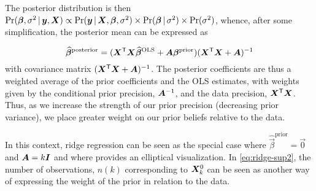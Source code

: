The posterior distribution is then
$\Pr (\bm{\beta}, \sigma^2 \, | \, \bm{y}, \bm{X}) \propto \Pr (\bm{y} \, | \, \bm{X}, \bm{\beta}, \sigma^2) \times
\Pr (\bm{\beta} \, | \, \sigma^2) \times \Pr (\sigma^2)$,
whence, after some simplification,
the posterior mean can be expressed as

\begin{equation}
\widehat{\bm{\beta}}^{\mathrm{posterior}} =
(\bm{X}^\mathsf{T} \bm{X}\widehat{\bm{\beta}}^{\mathrm{OLS}} + \bm{A} \bm{\beta}^{\mathrm{prior}})
(\bm{X}^\mathsf{T} \bm{X}+\bm{A})^{-1}
\end{equation}
with covariance matrix $(\bm{X}^\mathsf{T} \bm{X}+\bm{A})^{-1}$. The posterior coefficients are thus a weighted average of
the prior coefficients and the OLS estimates, with weights given by the conditional prior precision, $\bm{A}^{-1}$,
and the data precision, $\bm{X}^\mathsf{T}\bm{X}$.  Thus, as we increase the strength of our prior precision (decreasing
prior variance), we place greater weight on our prior beliefs relative to the data.

In this context, ridge regression can be seen as the special case where $\widehat{\vec{\beta}}^{\mathrm{prior}} = \vec{0}$ and $\bm{A} = k \bm{I}$
and where  provides an elliptical visualization. In \eqref{eq:ridge-sup2}, the number of observations,
$n(k)$ corresponding to $\bm{X}_k^0$ can be seen as another way of expressing the weight of the prior in relation to the data.




